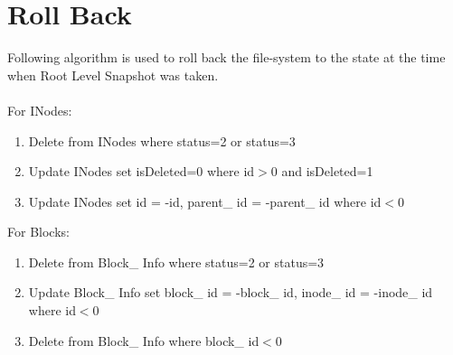 \section{Roll Back}
 Following algorithm is used to roll back the file-system to the state at the time when Root Level Snapshot was taken.\\\\
For INodes:
\begin{enumerate}
\item Delete from INodes where status=2 or status=3
\item Update INodes set isDeleted=0 where id$>$0 and isDeleted=1
\item Update INodes set id = -id, parent\_ id = -parent\_ id where id$<$0
\end{enumerate}
For Blocks:
\begin{enumerate}
\item Delete from Block\_ Info where status=2 or status=3
\item Update Block\_ Info set block\_ id = -block\_ id, inode\_ id = -inode\_ id where id$<$0
\item Delete from Block\_ Info where block\_ id$<$0
\end{enumerate}
\label{alg:ROSSRB}





